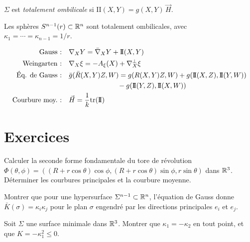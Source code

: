 \begin{definition}
$\Sigma$ est \emph{totalement ombilicale} si $\mathrm{I\!I}(X, Y) = g(X, Y)\, \vec{H}$.
\end{definition}

\begin{exemple}
Les sph\`eres $S^{n-1}(r) \subset \mathbb{R}^n$ sont totalement ombilicales, avec
$\kappa_1 = \cdots = \kappa_{n-1} = 1/r$.
\end{exemple}

\begin{formules}[title=\textbf{Formules fondamentales des sous-vari\'et\'es}]
\begin{align*}
    \text{Gauss~:} \quad & \nabla_X Y = \bar{\nabla}_X Y + \mathrm{I\!I}(X, Y) \\
    \text{Weingarten~:} \quad & \nabla_X \xi = -A_\xi(X) + \nabla_X^\perp \xi \\
    \text{\'Eq. de Gauss~:} \quad & \bar{g}(\bar{R}(X,Y)Z, W) = g(R(X,Y)Z, W)
        + g(\mathrm{I\!I}(X,Z), \mathrm{I\!I}(Y,W)) \\
    & \qquad\qquad\qquad\quad - g(\mathrm{I\!I}(Y,Z), \mathrm{I\!I}(X,W)) \\
    \text{Courbure moy.~:} \quad & \vec{H} = \frac{1}{k}\mathrm{tr}(\mathrm{I\!I})
\end{align*}
\end{formules}

\section{Exercices}

\begin{exercice}
Calculer la seconde forme fondamentale du tore de r\'evolution
$\Phi(\theta, \phi) = ((R + r\cos\theta)\cos\phi,
(R + r\cos\theta)\sin\phi, r\sin\theta)$ dans $\mathbb{R}^3$. D\'eterminer les courbures
principales et la courbure moyenne.
\end{exercice}

\begin{exercice}
Montrer que pour une hypersurface $\Sigma^{n-1} \subset \mathbb{R}^n$, l'\'equation de Gauss
donne $\bar{K}(\sigma) = \kappa_i \kappa_j$ pour le plan $\sigma$ engendr\'e par les
directions principales $e_i$ et $e_j$.
\end{exercice}

\begin{exercice}
Soit $\Sigma$ une surface minimale dans $\mathbb{R}^3$. Montrer que $\kappa_1 = -\kappa_2$
en tout point, et que $K = -\kappa_1^2 \leq 0$.
\end{exercice}

